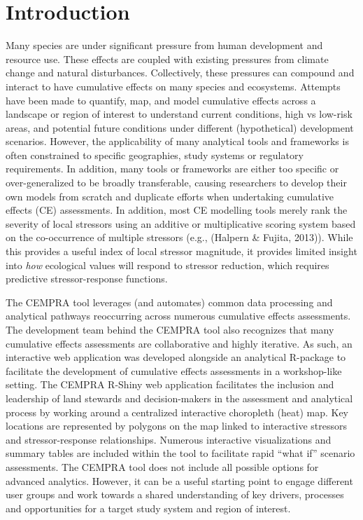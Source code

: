 \documentclass[
  letterpaper,
  DIV=11,
  numbers=noendperiod]{scrreprt}
\begin{document}

\hypertarget{introduction}{%
\chapter{Introduction}\label{introduction}}

Many species are under significant pressure from human development and
resource use. These effects are coupled with existing pressures from
climate change and natural disturbances. Collectively, these pressures
can compound and interact to have cumulative effects on many species and
ecosystems. Attempts have been made to quantify, map, and model
cumulative effects across a landscape or region of interest to
understand current conditions, high vs low-risk areas, and potential
future conditions under different (hypothetical) development scenarios.
However, the applicability of many analytical tools and frameworks is
often constrained to specific geographies, study systems or regulatory
requirements. In addition, many tools or frameworks are either too
specific or over-generalized to be broadly transferable, causing
researchers to develop their own models from scratch and duplicate
efforts when undertaking cumulative effects (CE) assessments. In
addition, most CE modelling tools merely rank the severity of local
stressors using an additive or multiplicative scoring system based on
the co-occurrence of multiple stressors (e.g., (Halpern \& Fujita,
2013)). While this provides a useful index of local stressor magnitude,
it provides limited insight into \emph{how} ecological values will
respond to stressor reduction, which requires predictive
stressor-response functions.

The CEMPRA tool leverages (and automates) common data processing and
analytical pathways reoccurring across numerous cumulative effects
assessments. The development team behind the CEMPRA tool also recognizes
that many cumulative effects assessments are collaborative and highly
iterative. As such, an interactive web application was developed
alongside an analytical R-package to facilitate the development of
cumulative effects assessments in a workshop-like setting. The CEMPRA
R-Shiny web application facilitates the inclusion and leadership of land
stewards and decision-makers in the assessment and analytical process by
working around a centralized interactive choropleth (heat) map. Key
locations are represented by polygons on the map linked to interactive
stressors and stressor-response relationships. Numerous interactive
visualizations and summary tables are included within the tool to
facilitate rapid ``what if'' scenario assessments. The CEMPRA tool does
not include all possible options for advanced analytics. However, it can
be a useful starting point to engage different user groups and work
towards a shared understanding of key drivers, processes and
opportunities for a target study system and region of interest.
\end{document}
